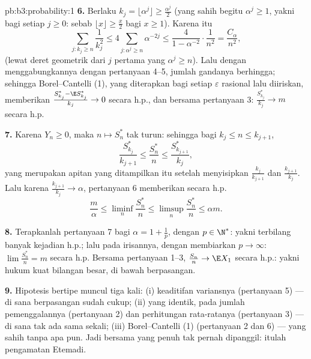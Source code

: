 \begin{solution}{pb:b3:probability:1}
\textbf{6.} Berlaku $k_j = \lfloor\alpha^j\rfloor \geq
\frac{\alpha^j}2$ (yang sahih begitu $\alpha^j \geq 1$, yakni bagi setiap
$j \geq 0$: sebab $\lfloor x\rfloor \geq \frac x2$ bagi $x \geq
1$). Karena itu
\[
\sum_{j : k_j \geq n}\frac1{k_j^2}
\leq 4\sum_{j : \alpha^j \geq n}\alpha^{-2j}
\leq \frac{4}{1 - \alpha^{-2}}\cdot\frac1{n^2}
= \frac{C_\alpha}{n^2},
\]
(lewat deret geometrik dari $j$ pertama yang $\alpha^j \geq
n$). Lalu dengan menggabungkannya dengan pertanyaan 4--5, jumlah gandanya
berhingga; sehingga Borel--Cantelli (1), yang diterapkan bagi setiap
$\varepsilon$ rasional lalu diiriskan, memberikan
$\frac{S^*_{k_j} - \E S^*_{k_j}}{k_j} \to 0$ secara h.p., dan bersama
pertanyaan 3: $\frac{S^*_{k_j}}{k_j} \to m$ secara h.p.

\textbf{7.} Karena $Y_n \geq 0$, maka $n \mapsto S^*_n$
tak turun: sehingga bagi $k_j \leq n \leq k_{j+1}$,
\[
\frac{S^*_{k_j}}{k_{j+1}} \leq \frac{S^*_n}{n} \leq
\frac{S^*_{k_{j+1}}}{k_j},
\]
yang merupakan apitan yang ditampilkan itu setelah menyisipkan
$\frac{k_j}{k_{j+1}}$ dan $\frac{k_{j+1}}{k_j}$. Lalu karena
$\frac{k_{j+1}}{k_j} \to \alpha$, pertanyaan 6 memberikan secara h.p.
\[
\frac m\alpha \leq \liminf_n\frac{S^*_n}n \leq
\limsup_n\frac{S^*_n}n \leq \alpha m .
\]

\textbf{8.} Terapkanlah pertanyaan 7 bagi $\alpha = 1 + \frac1p$, dengan $p
\in \N^*$: yakni terbilang banyak kejadian h.p.; lalu pada
irisannya, dengan membiarkan $p \to \infty$: $\lim\frac{S^*_n}n =
m$ secara h.p. Bersama pertanyaan 1--3, $\frac{S_n}n \to \E X_1$
secara h.p.: yakni hukum kuat bilangan besar, di bawah 
berpasangan.

\textbf{9.} Hipotesis bertipe  muncul tiga
kali: (i) keaditifan variansnya (pertanyaan 5) ---
di sana berpasangan sudah cukup; (ii)  yang identik, pada
jumlah pemenggalannya (pertanyaan 2) dan perhitungan rata-ratanya
(pertanyaan 3) --- di sana tak ada  sama sekali; (iii)
Borel--Cantelli (1) (pertanyaan 2 dan 6) --- yang sahih tanpa
 apa pun. Jadi  bersama yang penuh tak pernah
dipanggil: itulah pengamatan Etemadi.


\end{solution}
